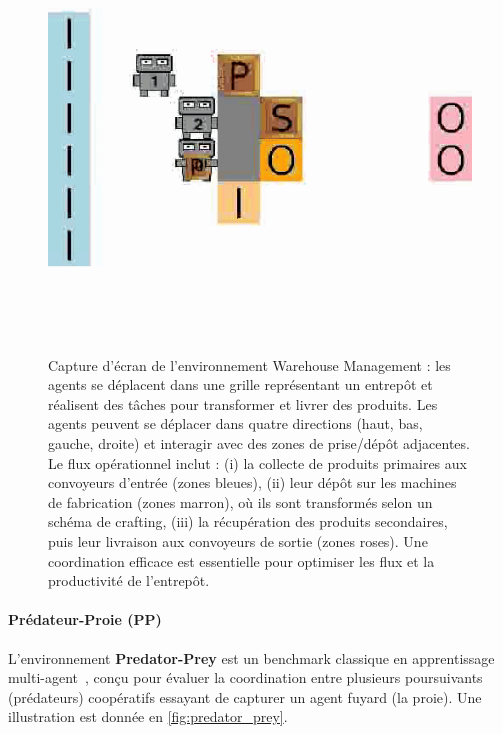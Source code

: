 \documentclass[pdflatex,sn-mathphys-num]{sn-jnl}%
\theoremstyle{thmstyleone}%
\theoremstyle{thmstyletwo}%
\theoremstyle{thmstylethree}%
\begin{document}
\begin{figure}[h!]
    \centering
    \includegraphics[width=0.6\linewidth]{figures/wm.png}
    \caption{Capture d'écran de l'environnement Warehouse Management : les agents se déplacent dans une grille représentant un entrepôt et réalisent des tâches pour transformer et livrer des produits. Les agents peuvent se déplacer dans quatre directions (haut, bas, gauche, droite) et interagir avec des zones de prise/dépôt adjacentes. Le flux opérationnel inclut : (i) la collecte de produits primaires aux convoyeurs d'entrée (zones bleues), (ii) leur dépôt sur les machines de fabrication (zones marron), où ils sont transformés selon un schéma de crafting, (iii) la récupération des produits secondaires, puis leur livraison aux convoyeurs de sortie (zones roses). Une coordination efficace est essentielle pour optimiser les flux et la productivité de l'entrepôt.}
    \label{fig:warehouse}
\end{figure}

\paragraph{Prédateur-Proie (PP)}

L'environnement \textbf{Predator-Prey} est un benchmark classique en apprentissage multi-agent~\cite{lowe2017multi}, conçu pour évaluer la coordination entre plusieurs poursuivants (prédateurs) coopératifs essayant de capturer un agent fuyard (la proie). Une illustration est donnée en \autoref{fig:predator_prey}.
\end{document}
